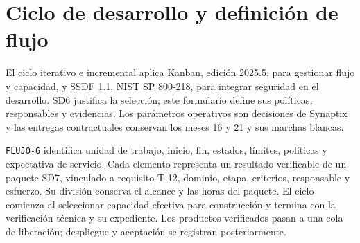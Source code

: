 \section{Ciclo de desarrollo y definición de flujo}
El ciclo iterativo e incremental aplica Kanban, edición 2025.5, para gestionar flujo y capacidad, y SSDF 1.1, NIST SP 800-218, para integrar seguridad en el desarrollo. SD6 justifica la selección; este formulario define sus políticas, responsables y evidencias. Los parámetros operativos son decisiones de Synaptix y las entregas contractuales conservan los meses 16 y 21 y sus marchas blancas. \parencites[pp.~3--5]{sd6-kanban}[sec.~2; tabla~1]{sd6-ssdf}[art.~17, pp.~12--13]{sd6-ba}

\texttt{FLUJO-6} identifica unidad de trabajo, inicio, fin, estados, límites, políticas y expectativa de servicio. Cada elemento representa un resultado verificable de un paquete SD7, vinculado a requisito T-12, dominio, etapa, criterios, responsable y esfuerzo. Su división conserva el alcance y las horas del paquete. El ciclo comienza al seleccionar capacidad efectiva para construcción y termina con la verificación técnica y su expediente. Los productos verificados pasan a una cola de liberación; despliegue y aceptación se registran posteriormente.


